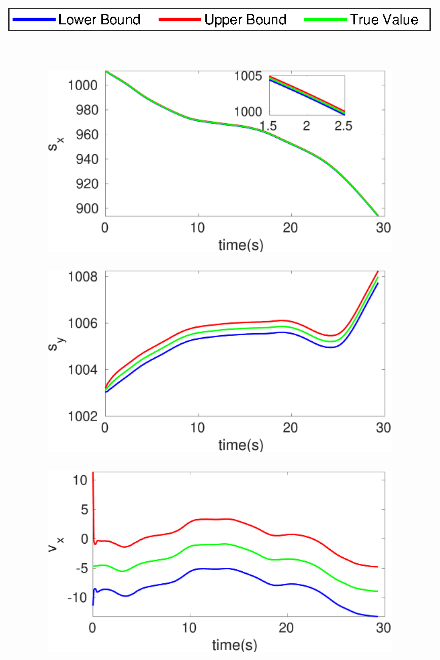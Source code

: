 \begin{figure}[h]
\hspace*{\fill} \includegraphics[scale=0.8]{figures/legend}\\\\
\begin{subfigure}{.5\linewidth}
\centering
\includegraphics[width=\linewidth]{figures/Frad/s3caSMs_x}
\end{subfigure}
\begin{subfigure}{.5\linewidth}
\centering
\includegraphics[width=\linewidth]{figures/Frad/s3caSMs_y}
\end{subfigure}
\begin{subfigure}{.5\linewidth}
\centering
\includegraphics[width=\linewidth]{figures/Frad/s3caSMv_x}

\end{subfigure}
\end{figure}
